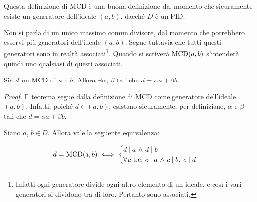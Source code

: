 \begin{remark*}
    Questa definizione di MCD è una buona definizione dal momento che sicuramente
    esiste un generatore dell'ideale $(a,b)$, dacché $D$ è un PID.
\end{remark*}

\begin{remark*}
    Non si parla di un unico massimo comun divisore, dal momento che
    potrebbero esservi più generatori dell'ideale $(a,b)$. Segue tuttavia che tutti questi generatori sono in realtà
    associati\footnote{Infatti ogni generatore divide ogni
        altro elemento di un ideale, e così i vari generatori si
        dividono tra di loro. Pertanto sono associati.}.
    Quando si scriverà
    $\operatorname{MCD}(a,b)$ s'intenderà quindi uno qualsiasi di questi associati.
\end{remark*}

\begin{theorem}
    \label{th:bezout}
    Sia $d$ un MCD di $a$ e $b$. Allora
    $\exists \alpha$, $\beta$ tali che $d = \alpha a + \beta b$.
\end{theorem}

\begin{proof}
    Il teorema segue dalla definizione di MCD come generatore
    dell'ideale $(a,b)$. Infatti, poiché $d \in (a,b)$, esistono
    sicuramente, per definizione, $\alpha$ e $\beta$ tali che
    $d = \alpha a + \beta b$.
\end{proof}

\begin{proposition}
    \label{prop:mcd}
    Siano $a$, $b \in D$. Allora vale la seguente equivalenza:

    \[ d = \MCD(a, b) \iff \begin{cases} d \mid a \,\land\, d \mid b \\ \forall c \text{ t.c.\ } c \mid a \,\land\, c \mid b,\;c \mid d\end{cases}\]
\end{proposition}

